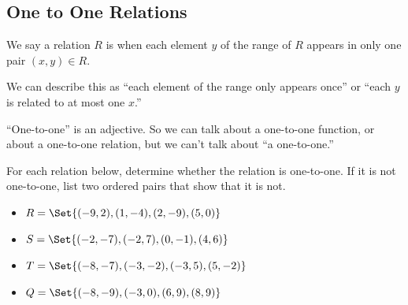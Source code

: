 \subsection{One to One Relations} 
\begin{definition}
We say a relation $R$ is  when each element $y$ of the range of $R$ appears in only one pair $(x,y)\in R$.
\end{definition}
We can describe this as ``each element of the range only appears once'' or ``each $y$ is related to at most one $x$.''
\begin{Note}``One-to-one'' is an adjective. So we can talk about a one-to-one function, or about a one-to-one relation, but we can't talk about ``a one-to-one.''\end{Note}
\begin{Example}
For each relation below, determine whether the relation is one-to-one. If it is not one-to-one, list two ordered pairs that show that it is not.
\begin{itemize}
\item $R=\Set{(-9,2),(1,-4),(2,-9),(5,0)}$\makeblanknew
\item $S=\Set{(-2,-7),(-2,7),(0,-1),(4,6)}$\makeblanknew
\item $T=\Set{(-8,-7),(-3,-2),(-3,5),(5,-2)}$\makeblanknew
\item $Q=\Set{(-8,-9),(-3,0),(6,9),(8,9)}$\makeblanknew
\end{itemize}
\end{Example}
